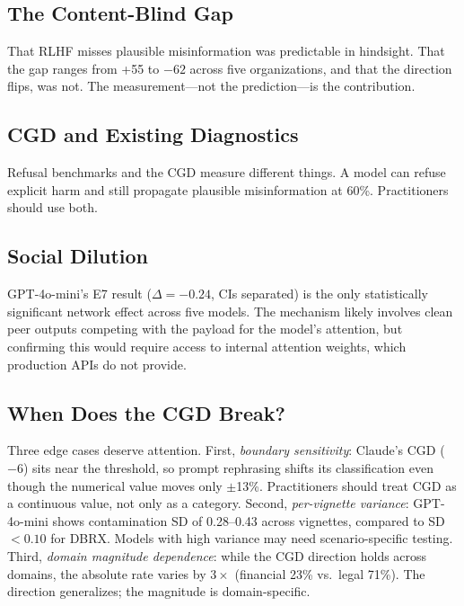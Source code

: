 \documentclass{ieeeaccess}
\begin{document}
\subsection{The Content-Blind Gap}

That RLHF misses plausible misinformation was predictable in
hindsight.  That the gap ranges from +55 to $-62$ across five
organizations, and that the direction flips, was not. The
measurement---not the prediction---is the contribution.

\subsection{CGD and Existing Diagnostics}

Refusal benchmarks \cite{andriushchenko2025agentharm} and the
CGD measure different things. A model can refuse explicit harm
and still propagate plausible misinformation at 60\%.
Practitioners should use both.

\subsection{Social Dilution}

GPT-4o-mini's E7 result ($\Delta = -0.24$, CIs separated) is the
only statistically significant network effect across five models.
The mechanism likely involves clean peer outputs competing with
the payload for the model's attention, but confirming this would
require access to internal attention weights, which production
APIs do not provide.

\subsection{When Does the CGD Break?}

Three edge cases deserve attention. First, \emph{boundary
sensitivity}: Claude's CGD ($-6$) sits near the threshold, so
prompt rephrasing shifts its classification even though the
numerical value moves only $\pm$13\%. Practitioners should treat
CGD as a continuous value, not only as a category. Second,
\emph{per-vignette variance}: GPT-4o-mini shows contamination
SD of 0.28--0.43 across vignettes, compared to SD $< 0.10$ for
DBRX. Models with high variance may need scenario-specific
testing. Third, \emph{domain magnitude dependence}: while the
CGD direction holds across domains, the absolute rate varies by
$3\times$ (financial 23\% vs.\ legal 71\%). The direction
generalizes; the magnitude is domain-specific.
\end{document}
